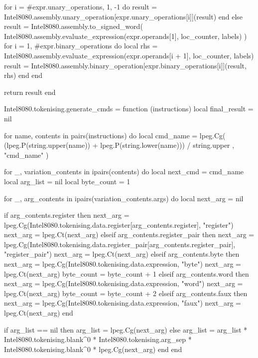         for i = #expr.unary_operations, 1, -1 do
            result = Intel8080.assembly.unary_operation[expr.unary_operations[i]](result)
        end
    else
        result = Intel8080.assembly.to_signed_word(
            Intel8080.assembly.evaluate_expression(expr.operands[1], loc_counter, labels)
        )
        for i = 1, #expr.binary_operations do
            local rhs = Intel8080.assembly.evaluate_expression(expr.operands[i + 1], loc_counter, labels)
            result = Intel8080.assembly.binary_operation[expr.binary_operations[i]](result, rhs)
        end
    end

    return result
end

Intel8080.tokenising.generate_cmds = function (instructions)
    local final_result = nil

    for name, contents in pairs(instructions) do
        local cmd_name = lpeg.Cg(
            (lpeg.P(string.upper(name)) + lpeg.P(string.lower(name))) / string.upper
            , "cmd_name"
        )

        for _, variation_contents in ipairs(contents) do
            local next_cmd = cmd_name
            local arg_list = nil
            local byte_count = 1

            for _, arg_contents in ipairs(variation_contents.args) do
                local next_arg = nil

                if arg_contents.register then
                    next_arg = lpeg.Cg(Intel8080.tokenising.data.register[arg_contents.register], "register")
                    next_arg = lpeg.Ct(next_arg)
                elseif arg_contents.register_pair then
                    next_arg = lpeg.Cg(Intel8080.tokenising.data.register_pair[arg_contents.register_pair], "register_pair")
                    next_arg = lpeg.Ct(next_arg)
                elseif arg_contents.byte then
                    next_arg = lpeg.Cg(Intel8080.tokenising.data.expression, "byte")
                    next_arg = lpeg.Ct(next_arg)
                    byte_count = byte_count + 1
                elseif arg_contents.word then
                    next_arg = lpeg.Cg(Intel8080.tokenising.data.expression, "word")
                    next_arg = lpeg.Ct(next_arg)
                    byte_count = byte_count + 2
                elseif arg_contents.faux then
                    next_arg = lpeg.Cg(Intel8080.tokenising.data.expression, "faux")
                    next_arg = lpeg.Ct(next_arg)
                end

                if arg_list == nil then
                    arg_list = lpeg.Cg(next_arg)
                else
                    arg_list = arg_list * Intel8080.tokenising.blank^0 * Intel8080.tokenising.arg_sep * Intel8080.tokenising.blank^0 * lpeg.Cg(next_arg)
                end
            end

